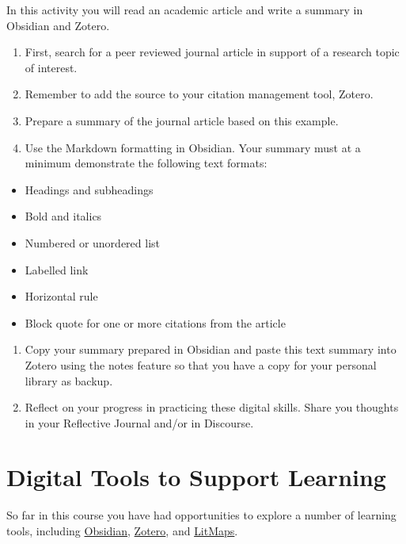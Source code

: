 \documentclass[
]{book}
\providecommand{\tightlist}{%
  \setlength{\itemsep}{0pt}\setlength{\parskip}{0pt}}
\theoremstyle{definition}
\theoremstyle{definition}
\theoremstyle{definition}
\theoremstyle{definition}
\theoremstyle{remark}
\begin{document}
\begin{reflect}
In this activity you will read an academic article and write a summary in Obsidian and Zotero.

\begin{enumerate}
\def\labelenumi{\arabic{enumi}.}
\tightlist
\item
  First, search for a peer reviewed journal article in support of a research topic of interest.
\item
  Remember to add the source to your citation management tool, Zotero.
\item
  Prepare a summary of the journal article based on this example.
\item
  Use the Markdown formatting in Obsidian. Your summary must at a minimum demonstrate the following text formats:
\end{enumerate}

\begin{itemize}
\tightlist
\item
  Headings and subheadings
\item
  Bold and italics
\item
  Numbered or unordered list
\item
  Labelled link
\item
  Horizontal rule
\item
  Block quote for one or more citations from the article
\end{itemize}

\begin{enumerate}
\def\labelenumi{\arabic{enumi}.}
\setcounter{enumi}{4}
\item
  Copy your summary prepared in Obsidian and paste this text summary into Zotero using the notes feature so that you have a copy for your personal library as backup.
\item
  Reflect on your progress in practicing these digital skills. Share you thoughts in your Reflective Journal and/or in Discourse.
\end{enumerate}
\end{reflect}

\hypertarget{digital-tools-to-support-learning}{%
\section{Digital Tools to Support Learning}\label{digital-tools-to-support-learning}}

So far in this course you have had opportunities to explore a number of learning tools, including \href{https://obsidian.md}{Obsidian}, \href{https://www.zotero.org/}{Zotero}, and \href{https://www.litmaps.com/}{LitMaps}.
\end{document}
